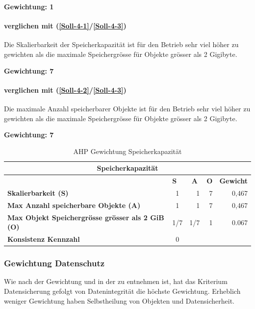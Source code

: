 \textbf{Gewichtung: 1}

\paragraph*{ verglichen mit  (\ref{Soll-4-1}/\ref{Soll-4-3})}
Die Skalierbarkeit der Speicherkapazität ist für den Betrieb sehr viel höher zu gewichten als die maximale Speichergrösse für Objekte grösser als 2 Gigibyte.

\textbf{Gewichtung: 7}

\paragraph*{ verglichen mit  (\ref{Soll-4-2}/\ref{Soll-4-3})}
Die maximale Anzahl speicherbarer Objekte ist für den Betrieb sehr viel höher zu gewichten als die maximale Speichergrösse für Objekte grösser als 2 Gigibyte.

\textbf{Gewichtung: 7}

\begin{table}[htbp]
\caption{AHP Gewichtung Speicherkapazität}
\begin{tabular}{|l|c|c|c|l|}
\hline
\multicolumn{ 5}{|c|}{\textbf{Speicherkapazität}} \\ \hline
 & \multicolumn{1}{l|}{\textbf{S}} & \textbf{A} & \textbf{O} & \textbf{Gewicht} \\ \hline
\textbf{Skalierbarkeit (S)} & 1 & \multicolumn{1}{r|}{1} & \multicolumn{1}{r|}{7} & \multicolumn{1}{r|}{0,467} \\ \hline
\textbf{Max Anzahl speicherbare Objekte (A)} & 1 & \multicolumn{1}{r|}{1} & \multicolumn{1}{r|}{7} & \multicolumn{1}{r|}{0,467} \\ \hline
\textbf{Max Objekt Speichergrösse grösser als 2 GiB (O)} & 1/7 & \multicolumn{1}{r|}{1/7} & \multicolumn{1}{r|}{1} & \multicolumn{1}{r|}{0.067} \\ \hline
\textbf{Konsistenz Kennzahl} & 0 \\ \cline{1-2}
\end{tabular}
\label{tab:AHPSpeicherkapazität}
\end{table}

\subsubsection*{Gewichtung Datenschutz}

Wie nach der Gewichtung und in der  zu entnehmen ist, hat das Kriterium Datensicherung gefolgt von Datenintegrität die höchste Gewichtung. Erheblich weniger Gewichtung haben Selbstheilung von Objekten und Datensicherheit.

